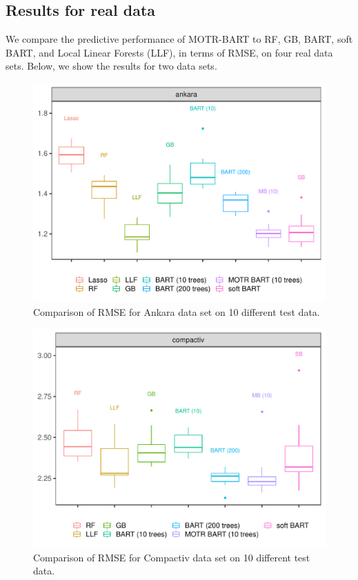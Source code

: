 \documentclass[
    ,title     = {{Bayesian Additive Regression Trees with Model Trees}}
    ,author    = {{Estevao B. Prado}}
    ,subject   = {{This is the subject of my work}}
   ,toplogo   = {{header_poster}}
,longtitle
]{dtuposter}
\begin{document}
\begin{dtupostercontent}
\section{Results for real data}
We compare the predictive performance of MOTR-BART to RF, GB, BART, soft BART, and Local Linear Forests (LLF), in terms of RMSE, on four real data sets. Below, we show the results for two data sets.
\begin{figure}
\includegraphics[width=.95\linewidth,origin=c]{ankara.pdf}
\caption{\hspace{-0.799cm} Comparison of RMSE for Ankara data set on 10 different test data.}
\end{figure}

\begin{figure}
\includegraphics[width=.95\linewidth,origin=c]{compactiv.pdf}
\caption{\hspace{-1.1cm} Comparison of RMSE for Compactiv data set on 10 different test data.}
\end{figure}


\end{dtupostercontent}
\end{document}
